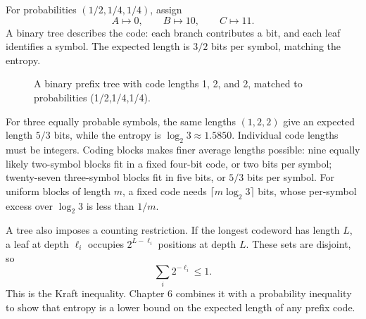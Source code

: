 \documentclass[11pt,oneside,openany]{book}
\theoremstyle{definition}
\theoremstyle{remark}
\numberwithin{equation}{chapter}
\begin{document}
For probabilities \((1/2,1/4,1/4)\), assign \[A\mapsto0,\qquad B\mapsto10,\qquad C\mapsto11.\] A binary tree describes the code: each branch contributes a bit, and each leaf identifies a symbol. The expected length is \(3/2\) bits per symbol, matching the entropy.

\begin{figure}[htbp]\centering
{}
\caption{A binary prefix tree with code lengths 1, 2, and 2, matched to probabilities (1/2,1/4,1/4).}\end{figure}

For three equally probable symbols, the same lengths \((1,2,2)\) give an expected length \(5/3\) bits, while the entropy is \(\log_2 3\approx1.5850\). Individual code lengths must be integers. Coding blocks makes finer average lengths possible: nine equally likely two-symbol blocks fit in a fixed four-bit code, or two bits per symbol; twenty-seven three-symbol blocks fit in five bits, or \(5/3\) bits per symbol. For uniform blocks of length \(m\), a fixed code needs \(\lceil m\log_2 3\rceil\) bits, whose per-symbol excess over \(\log_2 3\) is less than \(1/m\).

A tree also imposes a counting restriction. If the longest codeword has length \(L\), a leaf at depth \(\ell_i\) occupies \(2^{L-\ell_i}\) positions at depth \(L\). These sets are disjoint, so \[\sum_i2^{-\ell_i}\leq1.\] This is the Kraft inequality. Chapter 6 combines it with a probability inequality to show that entropy is a lower bound on the expected length of any prefix code.
\end{document}
